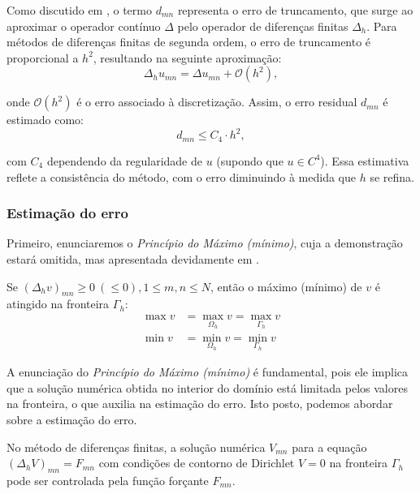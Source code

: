 \documentclass[column,amsmath,amssymb,floatfix]{revtex4}
\begin{document}
                Como discutido em \cite{Chen2014}, o termo $d_{mn}$ representa o erro de truncamento, que surge ao aproximar o operador contínuo $\Delta$ pelo operador de diferenças finitas $\Delta_h$. Para métodos de diferenças finitas de segunda ordem, o erro de truncamento é proporcional a $h^2$, resultando na seguinte aproximação:
                \begin{equation*}
                    \Delta_h u_{mn} = \Delta u_{mn} + \mathcal{O}(h^2),
                \end{equation*}
                
                onde $\mathcal{O}(h^2)$ é o erro associado à discretização. Assim, o erro residual $d_{mn}$ é estimado como:
                \begin{equation*}
                    d_{mn} \leq C_4 \cdot h^2,
                \end{equation*}
                
                com $C_4$ dependendo da regularidade de $u$ (supondo que $u \in C^4$). Essa estimativa reflete a consistência do método, com o erro diminuindo à medida que $h$ se refina.
            
            \subsubsection{Estimação do erro}
                Primeiro, enunciaremos o \textit{Princípio do Máximo (mínimo)}, cuja a demonstração estará omitida, mas apresentada devidamente em \cite{Chen2014}.
                    
                Se  $(\Delta_h v)_{mn} \geq 0 \ (\leq 0), 1 \leq m, n \leq N$, então o máximo (mínimo) de $v$ é atingido na fronteira $\Gamma_h$:
                \begin{align*}
                    \max v &= \max_{\Omega_h} v = \max_{\Gamma_h} v\\
                    \min v &= \min_{\Omega_h} v = \min_{\Gamma_h} v
                \end{align*}
        
                A enunciação do \textit{Princípio do Máximo (mínimo)} é fundamental, pois ele implica que a solução numérica obtida no interior do domínio está limitada pelos valores na fronteira, o que auxilia na estimação do erro. Isto posto, podemos abordar sobre a estimação do erro. 
                
                No método de diferenças finitas, a solução numérica $V_{mn}$ para a equação $(\Delta_h V)_{mn} = F_{mn}$ com condições de contorno de Dirichlet $V = 0$ na fronteira $\Gamma_h$ pode ser controlada pela função forçante $F_{mn}$.
\end{document}
